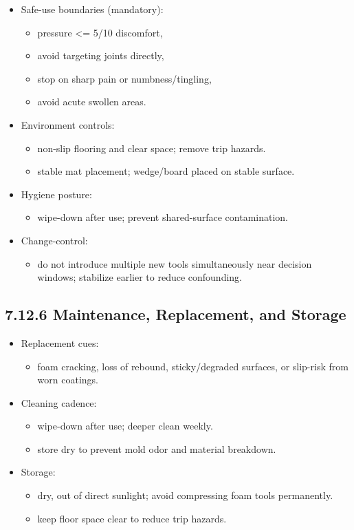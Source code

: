 \documentclass[10pt]{article}
\begin{document}
\begin{itemize}
\item Safe-use boundaries (mandatory):
  \begin{itemize}
  \item pressure <= 5/10 discomfort,
  \item avoid targeting joints directly,
  \item stop on sharp pain or numbness/tingling,
  \item avoid acute swollen areas.
  \end{itemize}
\item Environment controls:
  \begin{itemize}
  \item non-slip flooring and clear space; remove trip hazards.
  \item stable mat placement; wedge/board placed on stable surface.
  \end{itemize}
\item Hygiene posture:
  \begin{itemize}
  \item wipe-down after use; prevent shared-surface contamination.
  \end{itemize}
\item Change-control:
  \begin{itemize}
  \item do not introduce multiple new tools simultaneously near decision windows; stabilize earlier to reduce confounding.
  \end{itemize}
\end{itemize}

\subsection*{7.12.6 Maintenance, Replacement, and Storage}
{}

\begin{itemize}
\item Replacement cues:
  \begin{itemize}
  \item foam cracking, loss of rebound, sticky/degraded surfaces, or slip-risk from worn coatings.
  \end{itemize}
\item Cleaning cadence:
  \begin{itemize}
  \item wipe-down after use; deeper clean weekly.
  \item store dry to prevent mold odor and material breakdown.
  \end{itemize}
\item Storage:
  \begin{itemize}
  \item dry, out of direct sunlight; avoid compressing foam tools permanently.
  \item keep floor space clear to reduce trip hazards.
  \end{itemize}
\end{itemize}
\end{document}
